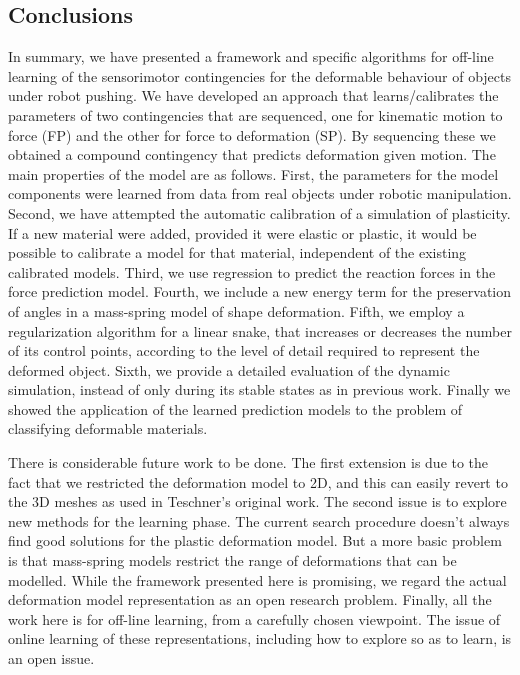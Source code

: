 \documentclass[journal]{IEEEtran}
\newcounter{algorithm}
\newcommand{\comment}[1]{{\color{red} #1}}
\begin{document}
\subsection{Conclusions}
In summary, we have presented a framework and specific algorithms for off-line learning of the sensorimotor contingencies for the deformable behaviour of objects under robot pushing. We have developed an approach that learns/calibrates the parameters of two contingencies that are sequenced, one for kinematic motion to force (FP) and the other for force to deformation (SP). By sequencing these we obtained a compound contingency that predicts deformation given motion. The main properties of the model are as follows. First, the parameters for the model components were learned from data from real objects under robotic manipulation. Second, we have attempted the automatic calibration of a simulation of plasticity. \comment{If a new material were added, provided it were elastic or plastic, it would be possible to calibrate a model for that material, independent of the existing calibrated models.} Third, we use regression to predict the reaction forces in the force prediction model. Fourth, we include a new energy term for the preservation of angles in a mass-spring model of shape deformation. Fifth, we employ a regularization algorithm for a linear snake, that increases or decreases the number of its control points, according to the level of detail required to represent the deformed object. Sixth, we provide a detailed evaluation of the dynamic simulation, instead of only during its stable states as in previous work. Finally we showed the application of the learned prediction models to the problem of classifying deformable materials.

There is considerable future work to be done. The first extension is due to the fact that we restricted the deformation model to 2D, and this can easily revert to the 3D meshes as used in Teschner's original work. The second issue is to explore new methods for the learning phase. The current search procedure doesn't always find good solutions for the plastic deformation model. But a more basic problem is that mass-spring models restrict the range of deformations that can be modelled. While the framework presented here is promising, we regard the actual deformation model representation as an open research problem. \comment{Finally, all the work here is for off-line learning, from a carefully chosen viewpoint. The issue of online learning of these representations, including how to explore so as to learn, is an open issue.}
\end{document}
